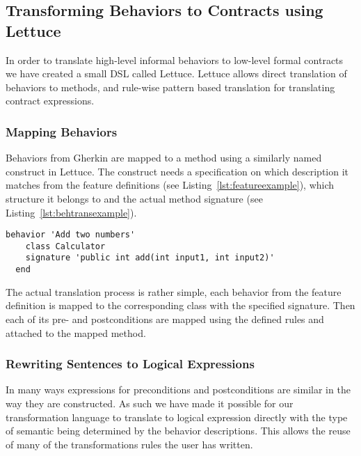 \subsection{Transforming Behaviors to Contracts using Lettuce}
\label{sub:Transforming Behaviors to Contracts using Lettuce}

In order to translate high-level informal behaviors to low-level formal
contracts we have created a small DSL called Lettuce.
Lettuce allows direct translation of behaviors to methods,
and rule-wise pattern based translation for translating contract expressions.

\subsubsection{Mapping Behaviors}
\label{sub:Mapping Behaviors}

Behaviors from Gherkin are mapped to a method using a similarly named
construct in Lettuce. The construct needs a specification on which
description it matches from the feature definitions (see Listing~\ref{lst:featureexample}),
which structure it belongs to and the actual method signature
(see Listing~\ref{lst:behtransexample}).

\begin{lstlisting}[caption={General Behavior Description of Adding Natural Numbers},label={lst:behtransexample}]
  behavior 'Add two numbers'
    class Calculator
    signature 'public int add(int input1, int input2)'
  end
\end{lstlisting}

The actual translation process is rather simple,
each behavior from the feature definition is mapped to the
corresponding class with the specified signature. Then each of its pre- 
and postconditions are mapped using the defined rules and attached to the mapped
method.

\subsubsection{Rewriting Sentences to Logical Expressions}
\label{sub:RewritingSentencestoLogicalExpressions}

In many ways expressions for
preconditions and postconditions are similar in the way they are constructed.
As such we have made it possible for our transformation language to translate
to logical expression directly with the type of semantic being determined by
the behavior descriptions. 
This allows the reuse of many of the transformations rules the user has written.


